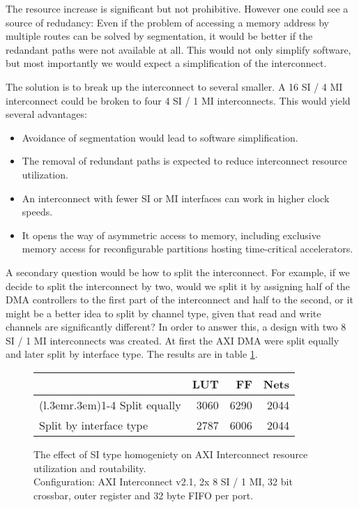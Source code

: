 The resource increase is significant but not prohibitive. 
However one could see a source of redudancy: Even if the problem
of accessing a memory address by multiple routes can be solved by segmentation,
it would be better if the redandant paths were not available at all.
This would not only simplify software, but most importantly we would expect
a simplification of the interconnect.

The solution is to break up the interconnect to several smaller. 
A 16 SI / 4 MI interconnect could be
broken to four 4 SI / 1 MI interconnects. 
This would yield several advantages:
\begin{itemize}
\item	Avoidance of segmentation would lead to software simplification.
\item	The removal of redundant paths is expected to reduce interconnect resource utilization.
\item	An interconnect with fewer SI or MI interfaces can work in higher clock speeds.
\item	It opens the way of asymmetric access to memory, including exclusive memory access
	for reconfigurable partitions hosting time-critical accelerators.
\end{itemize}
 
A secondary question would be how to split the interconnect. 
For example, if we decide to split the interconnect by two, 
would we split it by assigning half of the DMA controllers to the first
part of the interconnect and half to the second, or it might be a better idea to split by
channel type, given that read and write channels are significantly different? 
In order to answer this, a design with two 8 SI / 1 MI interconnects was created.
At first the AXI DMA were split equally and later split by interface type.
The results are in table \ref{tab:int-mixed}.

\begin{figure}[ht!]
\centering
\begin{tabular}{lrrr}
\toprule
			& LUT	& FF	& Nets \\
\cmidrule(l{.3em}r{.3em}){1-4}
Split equally 		& 3060	&6290	&2044 	\\
Split by interface type	& 2787	&6006	& 2044	\\
\bottomrule
\end{tabular}
\caption{The effect of SI type homogeniety on AXI Interconnect resource utilization and routability.\\
	Configuration: AXI Interconnect v2.1, 2x 8 SI / 1 MI, 32 bit crossbar, 
	outer register and 32 byte FIFO per port.}
\label{tab:int-mixed}
\end{figure}

